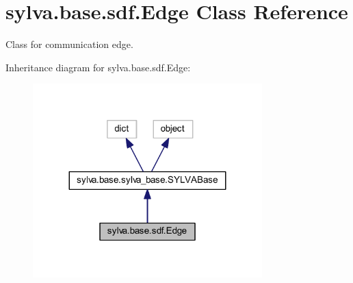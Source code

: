 \hypertarget{classsylva_1_1base_1_1sdf_1_1_edge}{}\section{sylva.\+base.\+sdf.\+Edge Class Reference}
\label{classsylva_1_1base_1_1sdf_1_1_edge}


Class for communication edge.  




Inheritance diagram for sylva.\+base.\+sdf.\+Edge\+:\nopagebreak
\begin{figure}[H]
\begin{center}
\leavevmode
\includegraphics[width=251pt]{classsylva_1_1base_1_1sdf_1_1_edge__inherit__graph}
\end{center}
\end{figure}
